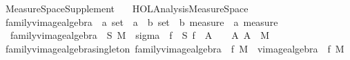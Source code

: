 %
\begin{isabellebody}%
%
%
\isadelimtheory
\isanewline
\isanewline
%
\endisadelimtheory
%
\isatagtheory
{}\isamarkupfalse%
\ Measure{\isacharunderscore}{\kern0pt}Space{\isacharunderscore}{\kern0pt}Supplement\isanewline
\ \ \ {\isachardoublequoteopen}HOL{\isacharminus}{\kern0pt}Analysis{\isachardot}{\kern0pt}Measure{\isacharunderscore}{\kern0pt}Space{\isachardoublequoteclose}\isanewline
{}%
\endisatagtheory
{\isafoldtheory}%
%
\isadelimtheory
%
\endisadelimtheory
%
\isadelimdocument
%
\endisadelimdocument
%
\isatagdocument
%
\isamarkuptrue%
%
\endisatagdocument
{\isafolddocument}%
%
\isadelimdocument
%
\endisadelimdocument
{}\isamarkupfalse%
\ family{\isacharunderscore}{\kern0pt}vimage{\isacharunderscore}{\kern0pt}algebra\ {\isacharcolon}{\kern0pt}{\isacharcolon}{\kern0pt}\ {\isachardoublequoteopen}{\isacharprime}{\kern0pt}a\ set\ {\isasymRightarrow}\ {\isacharparenleft}{\kern0pt}{\isacharprime}{\kern0pt}a\ {\isasymRightarrow}\ {\isacharprime}{\kern0pt}b{\isacharparenright}{\kern0pt}\ set\ {\isasymRightarrow}\ {\isacharprime}{\kern0pt}b\ measure\ {\isasymRightarrow}\ {\isacharprime}{\kern0pt}a\ measure{\isachardoublequoteclose}\ \isanewline
\ \ {\isachardoublequoteopen}family{\isacharunderscore}{\kern0pt}vimage{\isacharunderscore}{\kern0pt}algebra\ {\isasymOmega}\ S\ M\ {\isasymequiv}\ sigma\ {\isasymOmega}\ {\isacharparenleft}{\kern0pt}{\isasymUnion}f\ {\isasymin}\ S{\isachardot}{\kern0pt}\ {\isacharbraceleft}{\kern0pt}f\ {\isacharminus}{\kern0pt}{\isacharbackquote}{\kern0pt}\ A\ {\isasyminter}\ {\isasymOmega}\ {\isacharbar}{\kern0pt}\ A{\isachardot}{\kern0pt}\ A\ {\isasymin}\ M{\isacharbraceright}{\kern0pt}{\isacharparenright}{\kern0pt}{\isachardoublequoteclose}\isanewline
\isanewline
{}\isamarkupfalse%
\ family{\isacharunderscore}{\kern0pt}vimage{\isacharunderscore}{\kern0pt}algebra{\isacharunderscore}{\kern0pt}singleton{\isacharcolon}{\kern0pt}\ {\isachardoublequoteopen}family{\isacharunderscore}{\kern0pt}vimage{\isacharunderscore}{\kern0pt}algebra\ {\isasymOmega}\ {\isacharbraceleft}{\kern0pt}f{\isacharbraceright}{\kern0pt}\ M\ {\isacharequal}{\kern0pt}\ vimage{\isacharunderscore}{\kern0pt}algebra\ {\isasymOmega}\ f\ M{\isachardoublequoteclose}%
\isadelimproof
\ %
\endisadelimproof
%
\isatagproof
{}\isamarkupfalse%

\end{isabellebody}
